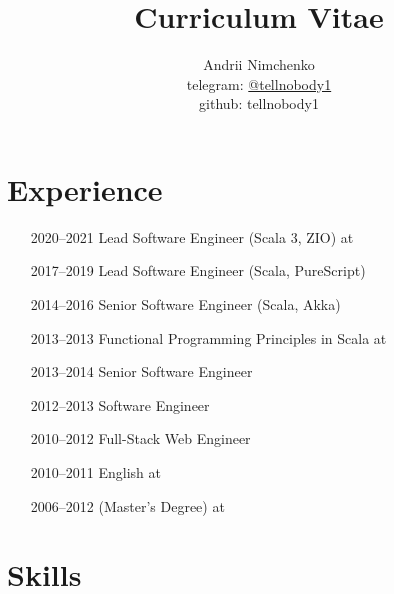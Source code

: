 


\title{Curriculum Vitae}
\author{
  Andrii Nimchenko\\
  telegram: \href{https://t.me/tellnobody1}{@tellnobody1}\\
  github: tellnobody1
}
\maketitle

\section{Experience}
\begin{itemize}
  \item[2020–2021] Lead Software Engineer (Scala 3, ZIO) at 
  \item[2017–2019] Lead Software Engineer (Scala, PureScript)
  \item[2014–2016] Senior Software Engineer (Scala, Akka)
  \item[2013–2013] Functional Programming Principles in Scala at 
  \item[2013–2014] Senior Software Engineer
  \item[2012–2013] Software Engineer
  \item[2010–2012] Full-Stack Web Engineer
  \item[2010–2011] English  at 
  \item[2006–2012]  (Master's Degree) at 
\end{itemize}

\section{Skills}



